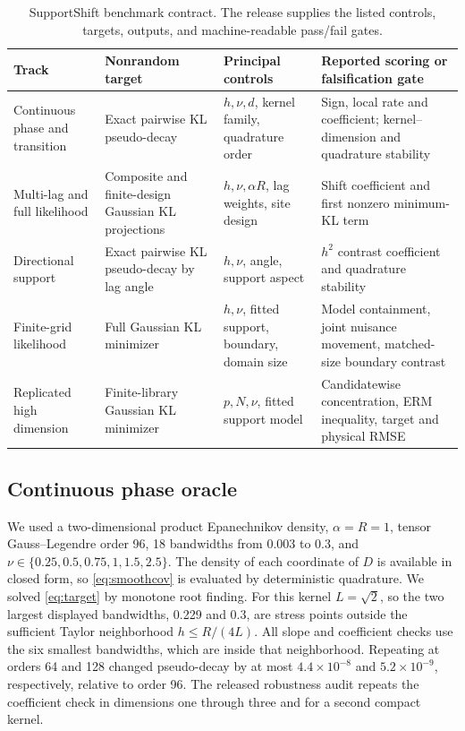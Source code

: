 \documentclass[sigconf]{acmart}
\theoremstyle{remark}
\begin{document}
\begin{table}[t]
\centering
\small
\caption{SupportShift benchmark contract. The release supplies the listed
controls, targets, outputs, and machine-readable pass/fail gates.}
\label{tab:benchmark-contract}
\begin{tabular}{p{}p{}p{}p{}}
\toprule
Track & Nonrandom target & Principal controls & Reported scoring or falsification gate \\
\midrule
Continuous phase and transition
& Exact pairwise KL pseudo-decay
& \(h,\nu,d\), kernel family, quadrature order
& Sign, local rate and coefficient; kernel--dimension and quadrature stability \\
Multi-lag and full likelihood
& Composite and finite-design Gaussian KL projections
& \(h,\nu,\alpha R\), lag weights, site design
& Shift coefficient and first nonzero minimum-KL term \\
Directional support
& Exact pairwise KL pseudo-decay by lag angle
& \(h,\nu\), angle, support aspect
& \(h^2\) contrast coefficient and quadrature stability \\
Finite-grid likelihood
& Full Gaussian KL minimizer
& \(h,\nu\), fitted support, boundary, domain size
& Model containment, joint nuisance movement, matched-size boundary contrast \\
Replicated high dimension
& Finite-library Gaussian KL minimizer
& \(p,N,\nu\), fitted support model
& Candidatewise concentration, ERM inequality, target and physical RMSE \\
\bottomrule
\end{tabular}
\end{table}

\subsection{Continuous phase oracle}

We used a two-dimensional product Epanechnikov density, \(\alpha=R=1\),
tensor Gauss--Legendre order 96, 18 bandwidths from 0.003 to 0.3, and
\(\nu\in\{0.25,0.5,0.75,1,1.5,2.5\}\). The density of each coordinate of
\(D\) is available in closed form, so \eqref{eq:smoothcov} is evaluated by
deterministic quadrature. We solved \eqref{eq:target} by monotone root finding.
For this kernel \(L=\sqrt2\), so the two largest displayed bandwidths, 0.229
and 0.3, are stress points outside the sufficient Taylor neighborhood
\(h\leq R/(4L)\). All slope and coefficient checks use the six smallest
bandwidths, which are inside that neighborhood.
Repeating at orders 64 and 128 changed pseudo-decay by at most
\(4.4\times10^{-8}\) and \(5.2\times10^{-9}\), respectively, relative to
order 96. The released robustness audit repeats the coefficient check in
dimensions one through three and for a second compact kernel.
\end{document}
